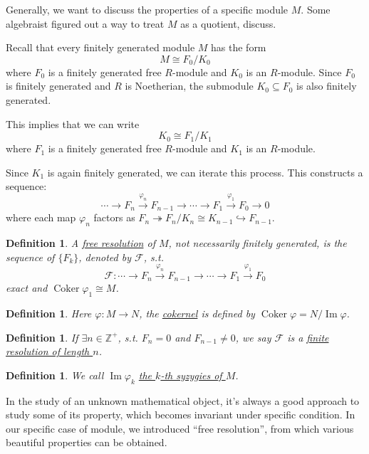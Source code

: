 \documentclass[11pt]{article}
\DeclareMathOperator{\ImOp}{Im} %
\DeclareMathOperator{\Coker}{Coker}
\newtheorem{definition}[theorem]{Definition}
\begin{document}
Generally, we want to discuss the properties of a specific module $M$. Some algebraist figured out a way to treat $M$ as a quotient, discuss.

Recall that every finitely generated module $M$ has the form
$$
M \cong F_0 / K_0
$$
where $F_0$ is a finitely generated free $R$-module and $K_0$ is an $R$-module. Since $F_0$ is finitely generated and $R$ is Noetherian, the submodule $K_0 \subseteq F_0$ is also finitely generated.

This implies that we can write
$$
K_0 \cong F_1 / K_1
$$
where $F_1$ is a finitely generated free $R$-module and $K_1$ is an $R$-module.

Since $K_1$ is again finitely generated, we can iterate this process. This constructs a sequence:
$$
\cdots \to F_n \xrightarrow{\varphi_n} F_{n-1} \to \cdots \to F_1 \xrightarrow{\varphi_1} F_0 \to 0
$$
where each map $\varphi_n$ factors as $F_n \twoheadrightarrow F_n / K_n \cong K_{n-1} \hookrightarrow F_{n-1}$.

\begin{definition}
    A \underline{free resolution} of $M$, not necessarily finitely generated, is the sequence of $\{F_k\}$, denoted by $\mathcal{F}$, s.t.
    $$ \mathcal{F}: \cdots \to F_n \xrightarrow{\varphi_n} F_{n-1} \to \cdots \to F_1 \xrightarrow{\varphi_1} F_0 $$
    exact and $\Coker \varphi_1 \cong M$.
\end{definition}

\begin{definition}
    Here $\varphi: M \to N$,
    the \underline{cokernel} is defined by $\Coker \varphi = N / \ImOp \varphi$.
\end{definition}

\begin{definition}
    If $\exists n \in \mathbb{Z}^+$, s.t. $F_n=0$ and $F_{n-1}\neq 0$, we say $\mathcal{F}$ is a \underline{finite resolution of length $n$}.
\end{definition}

\begin{definition}
    We call $\ImOp \varphi_k$ \underline{the $k$-th syzygies of $M$}.
\end{definition}

In the study of an unknown mathematical object, it's always a good approach to study some of its property, which becomes invariant under specific condition. 
In our specific case of module, we introduced ``free resolution'', from which various beautiful properties can be obtained.
\end{document}
